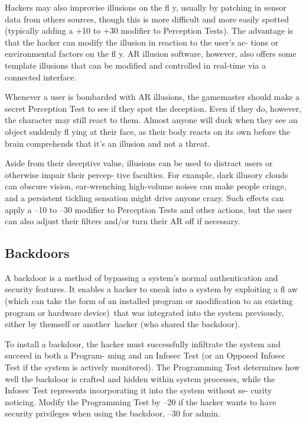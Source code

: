 Hackers may also improvise illusions on the 
fl y, usually by patching in sensor data from others 
sources, though this is more difficult and more easily 
spotted (typically adding a +10 to +30 modifier to 
Perception Tests). The advantage is that the hacker 
can modify the illusion in reaction to the user's ac-
tions or environmental factors on the fl y. AR illusion 
software, however, also offers some template illusions 
that can be modified and controlled in real-time via a 
connected interface.

Whenever a user is bombarded with AR illusions, the 
gamemaster should make a secret Perception Test to see 
if they spot the deception. Even if they do, however, the 
character may still react to them. Almost anyone will 
duck when they see an object suddenly fl ying at their 
face, as their body reacts on its own before the brain 
comprehends that it's an illusion and not a threat.

Aside from their deceptive value, illusions can be 
used to distract users or otherwise impair their percep-
tive faculties. For example, dark illusory clouds can 
obscure vision, ear-wrenching high-volume noises can 
make people cringe, and a persistent tickling sensation 
might drive anyone crazy. Such effects can apply a –10 
to –30 modifier to Perception Tests and other actions, 
but the user can also adjust their filters and/or turn 
their AR off if necessary.

\subsection{Backdoors}

A backdoor is a method of bypassing a system's normal 
authentication and security features. It enables a hacker 
to sneak into a system by exploiting a fl aw (which can 
take the form of an installed program or modification 
to an existing program or hardware device) that was 
integrated into the system previously, either by themself 
or another hacker (who shared the backdoor).

To install a backdoor, the hacker must successfully 
infiltrate the system and succeed in both a Program-
ming and an Infosec Test (or an Opposed Infosec Test 
if the system is actively monitored). The Programming 
Test determines how well the backdoor is crafted and 
hidden within system processes, while the Infosec Test 
represents incorporating it into the system without se-
curity noticing. Modify the Programming Test by –20 
if the hacker wants to have security privileges when 
using the backdoor, –30 for admin.

